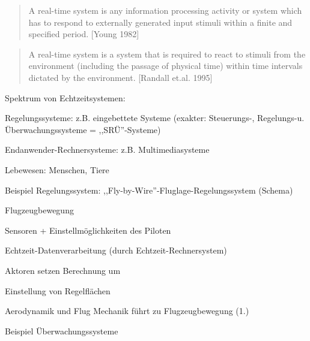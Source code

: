 \documentclass[a4paper]{article}
\begin{document}
\begin{multicols}{3}
    \begin{quote}
        A real-time system is any information processing activity or system
        which has to respond to externally generated input stimuli within a
        finite and specified period. [Young 1982]
    \end{quote}

    \begin{quote}
        A real-time system is a system that is required to react to stimuli from
        the environment (including the passage of physical time) within time
        intervals dictated by the environment. [Randall et.al. 1995]
    \end{quote}

    Spektrum von Echtzeitsystemen:

    \begin{enumerate*}
        \item
        Regelungssysteme: z.B. eingebettete Systeme (exakter: Steuerungs-,
        Regelungs-u. Überwachungssysteme = ,,SRÜ''-Systeme)
        \item
        Endanwender-Rechnersysteme: z.B. Multimediasysteme
        \item
        Lebewesen: Menschen, Tiere
    \end{enumerate*}

    Beispiel Regelungssystem: ,,Fly-by-Wire''-Fluglage-Regelungssystem
    (Schema)

    \begin{enumerate*}
        \item
        Flugzeugbewegung
        \item
        Sensoren + Einstellmöglichkeiten des Piloten
        \item
        Echtzeit-Datenverarbeitung (durch Echtzeit-Rechnersystem)
        \item
        Aktoren setzen Berechnung um
        \item
        Einstellung von Regelflächen
        \item
        Aerodynamik und Flug Mechanik führt zu Flugzeugbewegung (1.)
    \end{enumerate*}

    Beispiel Überwachungssysteme


\end{multicols}
\end{document}
